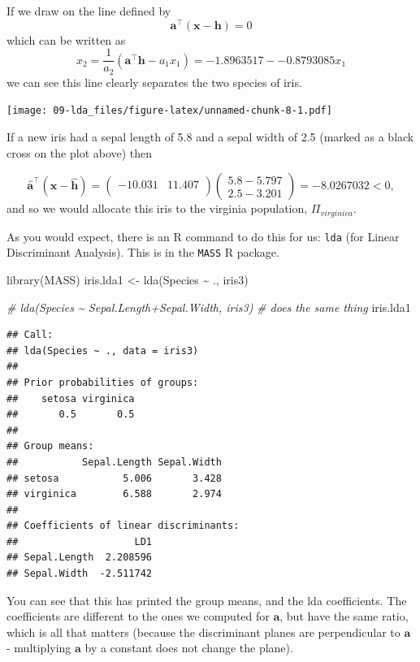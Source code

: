 \documentclass[
]{book}
\newenvironment{Shaded}{\begin{snugshade}}{\end{snugshade}}
\newcommand{\CommentTok}[1]{\textcolor[rgb]{0.56,0.35,0.01}{\textit{#1}}}
\newcommand{\FunctionTok}[1]{\textcolor[rgb]{0.00,0.00,0.00}{#1}}
\newcommand{\NormalTok}[1]{#1}
\newcommand{\OtherTok}[1]{\textcolor[rgb]{0.56,0.35,0.01}{#1}}
\newcommand{\SpecialCharTok}[1]{\textcolor[rgb]{0.00,0.00,0.00}{#1}}
\theoremstyle{definition}
\theoremstyle{definition}
\theoremstyle{definition}
\theoremstyle{definition}
\theoremstyle{remark}
\begin{document}
If we draw on the line defined by
\[\mathbf a^\top (\mathbf x-\mathbf h)=0\]
which can be written as
\[x_2 = \frac{1}{a_2}(\mathbf a^\top\mathbf h-a_1x_1) = -1.8963517 - -0.8793085 x_1\]
we can see this line clearly separates the two species of iris.

\texttt{[image: 09-lda\_files/figure-latex/unnamed-chunk-8-1.pdf]}

If a new iris had a sepal length of 5.8 and a sepal width of 2.5 (marked as a black cross on the plot above) then

\[ \hat{\mathbf a}^\top (\mathbf x- \hat{\mathbf h}) = \begin{pmatrix}-10.031&11.407 \\\end{pmatrix} \begin{pmatrix} 5.8 - 5.797 \\ 2.5 - 3.201 \end{pmatrix} =-8.0267032 < 0,\]
and so we would allocate this iris to the virginia population, \(\Pi_{virginica}\).

As you would expect, there is an R command to do this for us: \texttt{lda} (for Linear Discriminant Analysis). This is in the \texttt{MASS} R package.

\begin{Shaded}
\begin{Highlighting}[]
\FunctionTok{library}\NormalTok{(MASS)}
\NormalTok{iris.lda1 }\OtherTok{\textless{}{-}} \FunctionTok{lda}\NormalTok{(Species }\SpecialCharTok{\textasciitilde{}}\NormalTok{ ., iris3)}

\CommentTok{\# lda(Species \textasciitilde{} Sepal.Length+Sepal.Width, iris3) }
  \CommentTok{\#  does the same thing}
\NormalTok{iris.lda1}
\end{Highlighting}
\end{Shaded}

\begin{verbatim}
## Call:
## lda(Species ~ ., data = iris3)
## 
## Prior probabilities of groups:
##    setosa virginica 
##       0.5       0.5 
## 
## Group means:
##           Sepal.Length Sepal.Width
## setosa           5.006       3.428
## virginica        6.588       2.974
## 
## Coefficients of linear discriminants:
##                    LD1
## Sepal.Length  2.208596
## Sepal.Width  -2.511742
\end{verbatim}

You can see that this has printed the group means, and the lda coefficients. The coefficients are different to the ones we computed for \(\mathbf a\), but have the same ratio, which is all that matters (because the discriminant planes are perpendicular to \(\mathbf a\) - multiplying \(\mathbf a\) by a constant does not change the plane).
\end{document}
